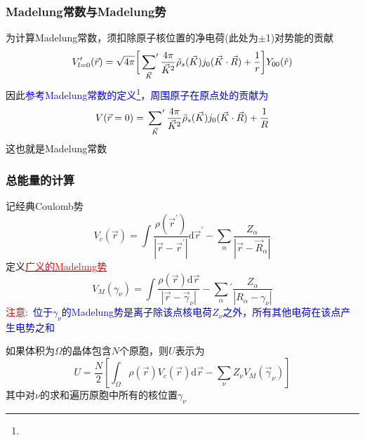 {\frame
{
	\frametitle{\textrm{Madelung}常数与\textrm{Madelung}势}
	为计算\textrm{Madelung}常数，须扣除原子核位置的净电荷(此处为$\pm$1)对势能的贡献
	\begin{displaymath}
		V_{l=0}^{\prime}(\vec r)=\sqrt{4\pi}\bigg[\sideset{}{^{\prime}}\sum_{\vec K}\dfrac{4\pi}{\vec K^2}\tilde\rho_s(\vec K)j_0(\vec K\cdot\vec R)+\dfrac1r\bigg]Y_{00}(\hat r)
	\end{displaymath}
	因此\textcolor{blue}{参考\textrm{Madelung}常数的定义\footnote{\fontsize{7.2pt}{6.2pt}}，周围原子在原点处的贡献为}
	\begin{displaymath}
		V(\vec r=0)=\sideset{}{^{\prime}}\sum_{\vec K}\dfrac{4\pi}{\vec K^2}\tilde\rho_s(\vec K)j_0(\vec K\cdot\vec R)+\dfrac1R
	\end{displaymath}
	这也就是\textrm{Madelung}常数
}

\frame
{
	\frametitle{总能量的计算}
	记经典\textrm{Coulomb}势
	\begin{displaymath}
		V_c(\vec r)=\int\dfrac{\rho(\vec r^{\prime})}{|\vec r-\vec r^{\prime}|}\mathrm{d}\vec r^{\prime}-\sum_{\alpha}\dfrac{Z_{\alpha}}{|\vec r-\vec R_{\alpha}|}
	\end{displaymath}
	定义\underline{\textcolor{red}{广义的\textrm{Madelung}势}}
	\begin{displaymath}
		V_M(\gamma_{\nu})=\int\dfrac{\rho(\vec r)\mathrm{d}\vec r}{|\vec r-\vec \gamma_{\nu}|}-\sum_{\alpha}{}^{\prime}\dfrac{Z_{\alpha}}{|R_{\alpha}-\gamma_{\nu}|}
	\end{displaymath}
	\textcolor{red}{注意}:~\textcolor{blue}{位于\textrm{$\gamma_{\nu}$的\textrm{Madelung}势是离子除该点核电荷$Z_{\nu}$之外，所有其他电荷在该点产生电势之和}}

	如果体积为$\Omega$的晶体包含$N$个原胞，则$U$表示为
	\begin{displaymath}
		U=\dfrac N2\left[\int_{\Omega}\rho(\vec r)V_c(\vec r)\mathrm{d}\vec r-\sum_{\nu}Z_{\nu}V_M(\vec \gamma_{\nu})\right]
	\end{displaymath}
	其中对$\nu$的求和遍历原胞中所有的核位置$\gamma_{\nu}$
}

}
